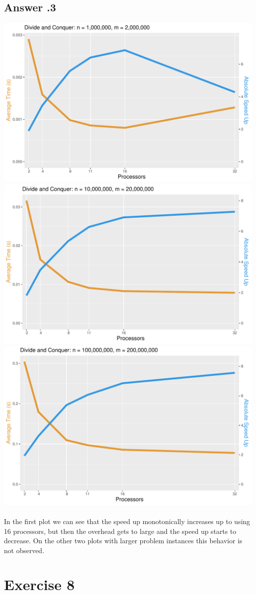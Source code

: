 \documentclass[a4paper,%
11pt,%
DIV=12,
headsepline,%
headings=normal,
]{scrartcl}
\newcounter{curex}
\newcommand{\exercise}[1]{\section*{Exercise #1}\setcounter{curex}{#1}}
\newcommand{\answer}[1]{\subsection*{Answer \arabic{curex}.#1}}
\begin{document}
\answer{3}
\includegraphics[scale=0.4,page=1]{../plots/merge_plot_Divide-and-Conquer_1000000_2000000}
\includegraphics[scale=0.4,page=1]{../plots/merge_plot_Divide-and-Conquer_10000000_20000000}
\includegraphics[scale=0.4,page=1]{../plots/merge_plot_Divide-and-Conquer_100000000_200000000}
\\
\\
In the first plot we can see that the speed up monotonically increases up to using 16 processors, but then the overhead gets to large and the speed up starts to decrease. On the other two plots with larger problem instances this behavior is not observed.
\exercise{8}
\end{document}
